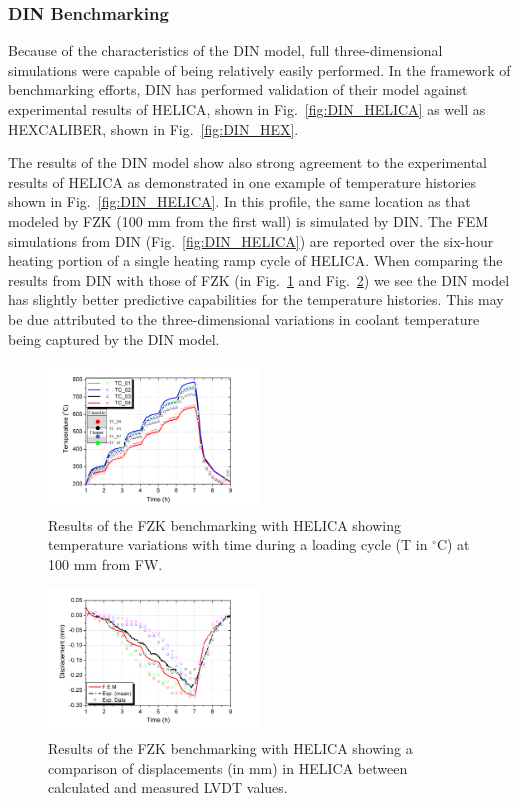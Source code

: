 \subsubsection{DIN Benchmarking}
Because of the characteristics of the DIN model, full three-dimensional simulations were capable of being relatively easily performed. In the framework of benchmarking efforts, DIN has performed validation of their model against experimental results of HELICA, shown in Fig.~\ref{fig:DIN_HELICA} as well as HEXCALIBER, shown in Fig.~\ref{fig:DIN_HEX}.

The results of the DIN model show also strong agreement to the experimental results of HELICA as demonstrated in one example of temperature histories shown in Fig.~\ref{fig:DIN_HELICA}. In this profile, the same location as that modeled by FZK (100 mm from the first wall) is simulated by DIN. The FEM simulations from DIN (Fig.~\ref{fig:DIN_HELICA}) are reported over the six-hour heating portion of a single heating ramp cycle of HELICA. When comparing the results from DIN with those of FZK (in Fig.~\ref{fig:FZK_HELICAa} and Fig.~\ref{fig:FZK_HELICAb}) we see the DIN model has slightly better predictive capabilities for the temperature histories. This may be due attributed to the three-dimensional variations in coolant temperature being captured by the DIN model. 


\begin{figure}[t!]
\centering
\includegraphics[width=0.5\textwidth]{chapters/figures/Fig-6}
\caption{Results of the FZK benchmarking with HELICA\cite{Gan:2009vn} showing temperature variations with time during a loading cycle (T in $^\circ$C) at 100 mm from FW.}\label{fig:FZK_HELICAa}
\end{figure}

\begin{figure}[t!]
\centering
\includegraphics[width=0.5\textwidth]{chapters/figures/Fig-7}
\caption{Results of the FZK benchmarking with HELICA\cite{Gan:2009vn} showing a comparison of displacements (in mm) in HELICA between calculated and measured LVDT values.}
\label{fig:FZK_HELICAb}
\end{figure}


